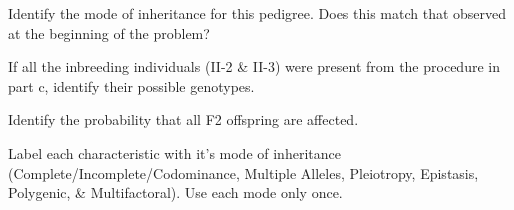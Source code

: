 \documentclass[addpoints]{exam}
\begin{document}
\begin{questions}
\begin{parts}
\begin{subparts}

\subpart[1] Identify the mode of inheritance for this pedigree. Does this match that observed at the beginning of the problem? 

\subpart[2] If all the inbreeding individuals (II-2 \& II-3) were present from the procedure in part c, identify their possible genotypes. 

\subpart[2] Identify the probability that all F2 offspring are affected. \fillin[0.5*0.5*1 = 0.25][0pt]

\end{subparts}

\end{parts}


\question Label each characteristic with it's mode of inheritance (Complete/Incomplete/Codominance, Multiple Alleles, Pleiotropy, Epistasis, Polygenic, \& Multifactoral). Use each mode only once.

\end{questions}
\end{document}
